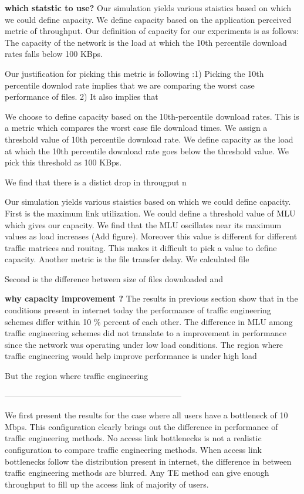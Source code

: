 \textbf{which statstic to use?}
Our simulation yields various staistics based on which we could define capacity.  We define capacity based on the application perceived metric of throughput. Our definition of capacity for our experiments is as follows: The capacity of the network is the load at which the 10th percentile download rates falls below 100 KBps.

Our justification for picking this metric is following :1) Picking the 10th percentile downlod rate implies that we are comparing the worst case performance of files.
2) It also implies that 

 We choose to define capacity based on the 10th-percentile download rates. This is a metric which compares the worst case file download times. We assign a threshold value of 10th percentile download rate. We define capacity as the load at which the 10th percentile download rate goes below the threshold value. We pick this threshold as 100 KBps. 

We find that there is a distict drop in througput n

Our simulation yields various staistics based on which we could define capacity. First is the maximum link utilization. We could define a threshold value of MLU which gives our capacity. We find that the MLU oscillates near its maximum values as load increases (Add figure). Moreover this value is different for different traffic matrices and rouitng. This makes it difficult to pick a value to define capacity. Another metric is the file transfer delay. We calculated file 

Second is the difference between size of files downloaded and 

\textbf{why capacity improvement ?}
The results in previous section show that in the conditions present in internet today the performance of traffic engineering schemes differ within 10 \% percent of each other. The difference in MLU among traffic engineering schemes  did not translate to a improvement in performance since the network was operating under low load conditions. 
The region where traffic engineering would help improve performance is under high load 

But the region where traffic engineering 



-----------------------------------------------------------------


We first present the results for the case where all users have a bottleneck of 10 Mbps. This configuration clearly brings out the difference in performance of traffic engineering methods. No access link bottlenecks is not a realistic configuration to compare traffic engineering methods. When access link bottlenecks follow the distribution present in internet,  the difference in between traffic engineering methods are blurred. Any TE method can give enough throughput to fill up the access link of majority of users. 

